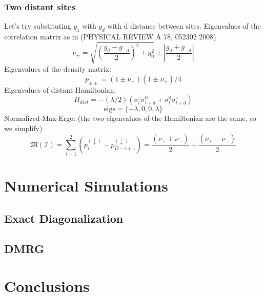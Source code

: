 \documentclass[12pt,a4paper]{report}
\begin{document}
\subsection{Two distant sites}
Let's try substituting $g_1$ with $g_d$ with d distance between sites.
Eigenvalues of the correlation matrix as in (PHYSICAL REVIEW A 78, 052302 2008)
\begin{equation}
	\nu_{\pm}=\sqrt{\left(\frac{g_{d}-g_{-d}}{2}\right)^{2}+g_{0}^{2}} \pm \left| \frac{g_{d}+g_{-d}}{2} \right|
\end{equation}
Eigenvalues of the density matrix:
\begin{equation}
	p_{\pm \pm } =(1 \pm \nu_-)(1 \pm \nu_+)/4
\end{equation}
Eigenvalues of distant Hamiltonian:
\begin{equation}
	H_{dist}=-(\lambda/2)(\sigma^z_l\sigma^0_{l+d} +\sigma^0_l\sigma^z_{l+d})
\end{equation}
\begin{equation}
	\text{eigs}= \{-\lambda,0,0 ,\lambda \}
\end{equation}
Normalized-Max-Ergo: (the two eigenvalues of the Hamiltonian are the same, so we simplify)
\begin{equation}
	\mathfrak{M}(\mathcal{I}) =	  \sum_{i=1}^ {2}\left(p_{i}^{(\downarrow)}-p_{D-i+1}^{(\downarrow)}\right) =	\frac{(\nu_+ + \nu_-)}{2}+\frac{(\nu_+-\nu_-)} {2}
\end{equation}




\chapter{Numerical Simulations}
\section{Exact Diagonalization}
\section{DMRG}

\chapter{Conclusions}
\end{document}

